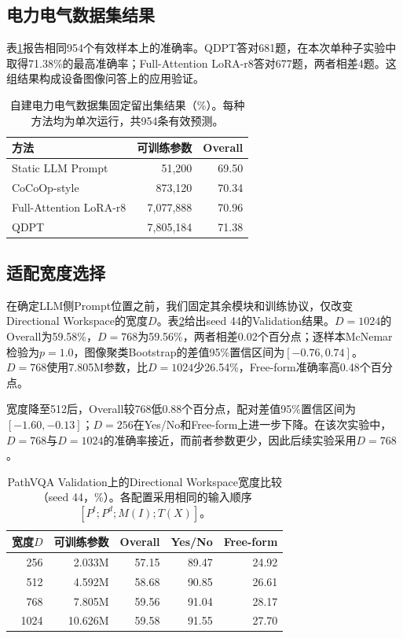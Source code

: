 \subsection{电力电气数据集结果}

表\ref{tab:electrical-results}报告相同954个有效样本上的准确率。QDPT答对681题，在本次单种子实验中取得71.38\%的最高准确率；Full-Attention LoRA-r8答对677题，两者相差4题。这组结果构成设备图像问答上的应用验证。

\begin{table}[t]
    \centering
    \caption{自建电力电气数据集固定留出集结果（\%）。每种方法均为单次运行，共954条有效预测。}
    \label{tab:electrical-results}
    \small
    \begin{tabular}{@{}lrr@{}}
        \toprule
        方法 & 可训练参数 & Overall \\
        \midrule
        Static LLM Prompt & 51,200 & 69.50 \\
        CoCoOp-style & 873,120 & 70.34 \\
        Full-Attention LoRA-r8 & 7,077,888 & 70.96 \\
        QDPT & 7,805,184 & 71.38 \\
        \bottomrule
    \end{tabular}
\end{table}

\subsection{适配宽度选择}

在确定LLM侧Prompt位置之前，我们固定其余模块和训练协议，仅改变Directional Workspace的宽度$D$。表\ref{tab:workspace-width}给出seed 44的Validation结果。$D=1024$的Overall为59.58\%，$D=768$为59.56\%，两者相差0.02个百分点；逐样本McNemar检验为$p=1.0$，图像聚类Bootstrap的差值95\%置信区间为$[-0.76,0.74]$。$D=768$使用7.805M参数，比$D=1024$少26.54\%，Free-form准确率高0.48个百分点。

宽度降至512后，Overall较768低0.88个百分点，配对差值95\%置信区间为$[-1.60,-0.13]$；$D=256$在Yes/No和Free-form上进一步下降。在该次实验中，$D=768$与$D=1024$的准确率接近，而前者参数更少，因此后续实验采用$D=768$。

\begin{table}[htbp]
    \centering
    \caption{PathVQA Validation上的Directional Workspace宽度比较（seed 44，\%）。各配置采用相同的输入顺序$[P^{t};P^{d};M(I);T(X)]$。}
    \label{tab:workspace-width}
    \small
    \begin{tabular}{@{}rrrrr@{}}
        \toprule
        宽度$D$ & 可训练参数 & Overall & Yes/No & Free-form \\
        \midrule
        256  & 2.033M  & 57.15 & 89.47 & 24.92 \\
        512  & 4.592M  & 58.68 & 90.85 & 26.61 \\
        768  & 7.805M  & 59.56 & 91.04 & 28.17 \\
        1024 & 10.626M & 59.58 & 91.55 & 27.70 \\
        \bottomrule
    \end{tabular}
\end{table}

